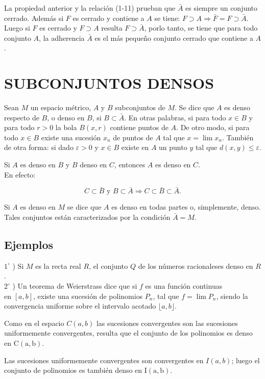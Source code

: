 \documentclass[10pt]{article}
\theoremstyle{plain}
\theoremstyle{definition}
\theoremstyle{remark}
\begin{document}
La propiedad anterior y la relación (1-11) prueban que $\bar{A}$ es siempre un conjunto cerrado. Además si $F$ es cerrado y contiene a $A$ se tiene: $F \supset A \Rightarrow \bar{F}=F \supset \bar{A}$. Luego si $F$ es cerrado y $F \supset A$ resulta $F \supset \bar{A}$, porlo tanto, se tiene que para todo conjunto $A$, la adherencia $\bar{A}$ es el más pequeño conjunto cerrado que contiene a $A$.

\section*{SUBCONJUNTOS DENSOS}
Sean $M$ un espacio métrico, $A$ y $B$ subconjuntos de $M$. Se dice que $A$ es denso respecto de $B$, o denso en $B$, si $B \subset \bar{A}$. En otras palabras, si para todo $x \in B$ y para todo $r>0$ la bola $B(x, r)$ contiene puntos de $A$. De otro modo, si para todo $x \in B$ existe una sucesión $x_{n}$ de puntos de $A$ tal que $x=\lim x_{n}$. También de otra forma: si dado $\varepsilon>0$ y $x \in B$ existe en $A$ un punto $y$ tal que $d(x, y) \leqslant \varepsilon$.

Si $A$ es denso en $B$ y $B$ denso en $C$, entonces $A$ es denso en $C$.\\
En efecto:

$$
C \subset \bar{B} \text { y } B \subset \bar{A} \Rightarrow C \subset \bar{B} \subset \bar{A} .
$$

Si $A$ es denso en $M$ se dice que $A$ es denso en todas partes o, simplemente, denso. Tales conjuntos están caracterizados por la condición $\bar{A}=M$.

\subsection{Ejemplos}
$1^{\circ}$ ) Si $M$ es la recta real $R$, el conjunto $Q$ de los números racionaleses denso en $R$.\\
$2^{\circ}$ ) Un teorema de Weierstrass dice que si $f$ es una función continuas\\
en $[a, b]$, existe una sucesión de polinomios $P_{n}$, tal que $f=\lim P_{n}$, siendo la convergencia uniforme sobre el intervalo acotado $\lfloor a, b\rfloor$.

Como en el espacio $C(a, b)$ las sucesiones convergentes son las sucesiones uniformemente convergentes, resulta que el conjunto de los polinomios es denso en $\mathrm{C}(\mathrm{a}, \mathrm{b})$.

Las sucesiones uniformemente convergentes son convergentes en $I(a, b)$; luego el conjunto de polinomios es también denso en $\mathrm{I}(\mathrm{a}, \mathrm{b})$.
\end{document}

